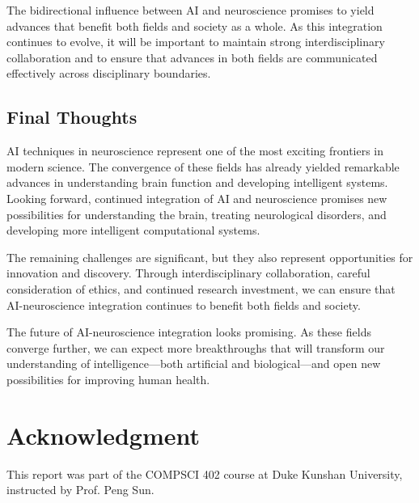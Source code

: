 \documentclass[conference]{IEEEtran}
\begin{document}
The bidirectional influence between AI and neuroscience promises to yield advances that benefit both fields and society as a whole. As this integration continues to evolve, it will be important to maintain strong interdisciplinary collaboration and to ensure that advances in both fields are communicated effectively across disciplinary boundaries.

\subsection{Final Thoughts}

AI techniques in neuroscience represent one of the most exciting frontiers in modern science. The convergence of these fields has already yielded remarkable advances in understanding brain function and developing intelligent systems. Looking forward, continued integration of AI and neuroscience promises new possibilities for understanding the brain, treating neurological disorders, and developing more intelligent computational systems.

The remaining challenges are significant, but they also represent opportunities for innovation and discovery. Through interdisciplinary collaboration, careful consideration of ethics, and continued research investment, we can ensure that AI-neuroscience integration continues to benefit both fields and society.

The future of AI-neuroscience integration looks promising. As these fields converge further, we can expect more breakthroughs that will transform our understanding of intelligence—both artificial and biological—and open new possibilities for improving human health.

\section*{Acknowledgment}
This report was part of the COMPSCI 402 course at Duke Kunshan University, instructed by Prof. Peng Sun.

{
\small


}

\nocite{*}
\end{document}
